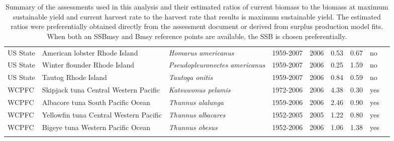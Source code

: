 \begin{longtable}{p{1.8cm}p{4cm}p{4cm}ccccp{1.9cm}c}
  US State & American lobster Rhode Island & \textit{Homarus americanus} & 1959-2007 & 2006 & 0.53 & 0.67 & no & \cite{NA} \\ 
  US State & Winter flounder Rhode Island & \textit{Pseudopleuronectes americanus} & 1959-2007 & 2006 & 0.25 & 1.59 & no & \cite{NA} \\ 
  US State & Tautog Rhode Island & \textit{Tautoga onitis} & 1959-2007 & 2006 & 0.84 & 0.59 & no & \cite{NA} \\ 
  WCPFC & Skipjack tuna Central Western Pacific & \textit{Katsuwonus pelamis} & 1972-2006 & 2006 & 4.38 & 0.30 & yes & \cite{SC4-SA-WP4-SKJ-Assessment-rev1-skipjack.pdf} \\ 
  WCPFC & Albacore tuna South Pacific Ocean & \textit{Thunnus alalunga} & 1959-2006 & 2006 & 2.46 & 0.90 & yes & \cite{JENSEN_ALBWPO_2008.pdf} \\ 
  WCPFC & Yellowfin tuna Central Western Pacific & \textit{Thunnus albacares} & 1952-2005 & 2005 & 1.22 & 0.80 & yes & \cite{WCPFC-SC3-SA-SWG-WP-01.pdf} \\ 
  WCPFC & Bigeye tuna Western Pacific Ocean & \textit{Thunnus obesus} & 1952-2006 & 2006 & 1.06 & 1.38 & yes & \cite{SC4-SA-WP1-rev1-bigeye-tuna.pdf} \\ 
   \hline
\hline
\caption{Summary of the assessments used in this analysis and their estimated ratios of current biomass to the biomass at maximum sustainable yield and current harvest rate to the harvest rate that results is maximum sustainable yield. The estimated ratios were preferentially obtained directly from the assessment document or derived from surplus production model fits. When both an SSBmsy and Bmsy reference points are available, the SSB is chosen preferentially.}
\label{tab:crosshair}
\end{longtable}
